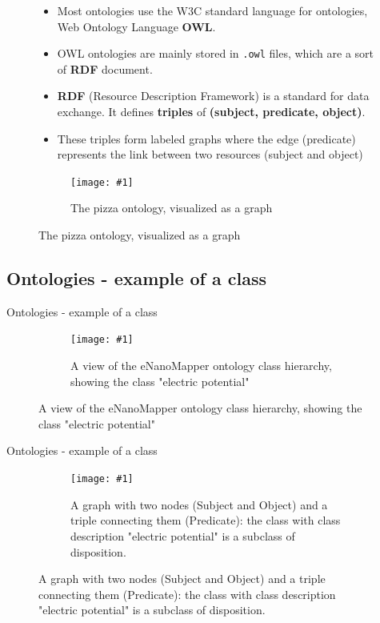 \documentclass[english, xcolor=dvipsnames, aspectratio=169]{beamer}
\newcommand{\includefigurelarger}[2]
{
    \begin{figure}[h]
    \caption{#2}
    \centering
    \texttt{[image: \#1]}
    \end{figure}
}
\newcommand{\includefiguremediumlarger}[2]
{
    \begin{figure}[h]
    \caption{#2}
    \centering
    \texttt{[image: \#1]}
    \end{figure}
}
\newcommand{\subsectiontitle}{}
\begin{document}
\begin{frame}{\subsectiontitle}
    \begin{figure}
        \begin{minipage}[b]{0.55\linewidth}
 			\begin{itemize}
\item Most ontologies use the W3C standard language for ontologies, Web Ontology Language \textbf{OWL}.
\item OWL ontologies are mainly stored in \texttt{.owl} files, which are a sort of \textbf{RDF} document.
\item \textbf{RDF} (Resource Description Framework) is a standard for data exchange. It defines \textbf{triples} of \textbf{(subject, predicate, object)}. \cite{noauthor_rdf_nodate}
\item These triples form labeled graphs where the edge (predicate) represents the link between two resources (subject and object)
    		\end{itemize}
        \end{minipage}
    \hfill
     \begin{minipage}[b]{0.4\linewidth}
            \centering
            \includefigurelarger{pizzaontology.png}{The pizza ontology, visualized as a graph \cite{drummond_pizza_nodate}}
        \end{minipage}
    \end{figure}
\end{frame}


% 
\renewcommand{\subsectiontitle}{Ontologies - example of a class}
\subsection{\subsectiontitle}
\begin{frame}{\subsectiontitle}
\begin{figure}
    
    \centering
	\includefiguremediumlarger{class-hierarchy.png}{A view of the eNanoMapper ontology class hierarchy, showing the class "electric potential"}
    \end{figure}
\end{frame}

% 
\begin{frame}{\subsectiontitle}

     
\begin{figure}
    
    \centering
	\includefigurelarger{rdf-graph-triple.pdf}{A graph with two nodes (Subject and Object) and a triple connecting them (Predicate): the class with class description "electric potential" is a subclass of disposition.}
    \end{figure}
\end{frame}
\end{document}
